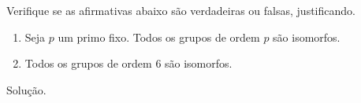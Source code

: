 \begin{homeworkProblem}
  Verifique se as afirmativas abaixo são verdadeiras ou falsas, justificando.
\begin{enumerate}
    \item Seja $p$ um primo fixo. Todos os grupos de ordem $p$ são isomorfos.
    \item Todos os grupos de ordem $6$ são isomorfos.
\end{enumerate}
  \begin{solution}
    Solução.
  \end{solution}
\end{homeworkProblem}
